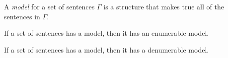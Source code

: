 \documentclass[syntax-and-semantics]{subfiles}
\begin{document}

\begin{defn}[Model]
A \emph{model} for a set of sentences $\Gamma$ is a structure that makes true all of the sentences in $\Gamma$.
\end{defn}


\begin{thm}
If a set of sentences has a model, then it has an enumerable model.
\end{thm}

\begin{thm}[L\"owenheim-Skolem for FOL without =]
If a set of sentences has a model, then it has a denumerable model.
\end{thm}
\end{document}

